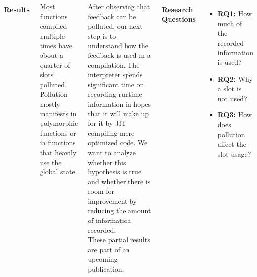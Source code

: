 \documentclass[a0paper,landscape]{tikzposter}
\begin{document}
\begin{columns}
{		\paragraph*{Results} Most functions compiled multiple times have about a quarter of slots polluted. Pollution mostly manifests in polymorphic functions or in functions that heavily use the global state. \\



	}


	{
		After observing that feedback can be polluted, our next step is to understand how the feedback is used in a compilation. The interpreter spends significant time on recording runtime information in hopes that it will make up for it by JIT compiling more optimized code. We want to analyze whether this hypothesis is true and whether there is room for improvement by reducing the amount of information recorded.\\

		These partial results are part of an upcoming publication.\\

		\paragraph*{Research Questions}
		\begin{itemize}
			\item[]\textbf{RQ1:} How much of the recorded information is used?
			\item[]\textbf{RQ2:} Why a slot is not used?
			\item[]\textbf{RQ3:} How does pollution affect the slot usage?\\
		\end{itemize}

}
\end{columns}
\end{document}
